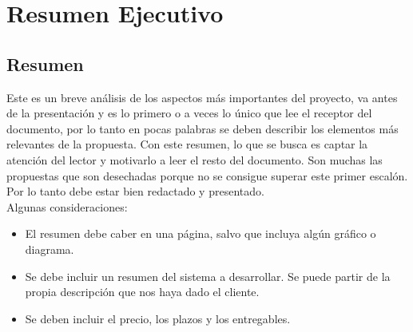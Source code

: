 
\chapter{Resumen Ejecutivo} %

\label{Chapter1} %


\section{Resumen}

Este es un breve análisis de los aspectos más importantes del proyecto, va antes de la presentación y es lo primero o a veces lo único que lee el receptor del documento, por lo tanto en pocas palabras se deben describir los elementos más relevantes de la propuesta. Con este resumen, lo que se busca es captar la atención del lector y motivarlo a leer el resto del documento. Son muchas las propuestas que son desechadas porque no se consigue superar este primer escalón. Por lo tanto debe estar bien redactado y presentado.\\

Algunas consideraciones:
\begin{itemize}
	\item El resumen debe caber en una página, salvo que incluya algún gráfico o diagrama.
	\item Se debe incluir un resumen del sistema a desarrollar. Se puede partir de la propia descripción que nos haya dado el cliente.
	\item Se deben incluir el precio, los plazos y los entregables.
\end{itemize}
